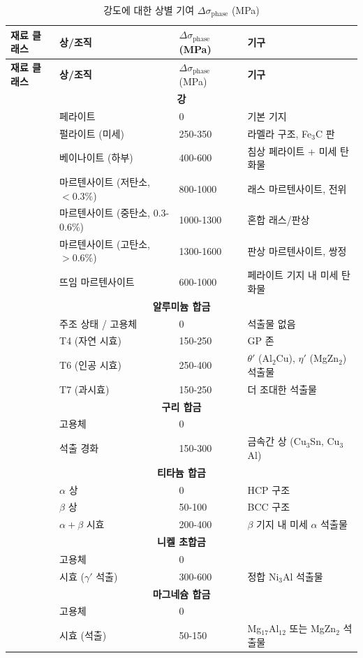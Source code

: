 \documentclass[12pt,a4paper]{article}
\begin{document}
	\begin{longtable}{p{3.5cm} p{3.0cm} p{3.0cm} p{4cm}}
		\caption{강도에 대한 상별 기여 $\Delta\sigma_{\text{phase}}$ (MPa)}\label{tab:phase_contrib}\\
		\toprule
		\textbf{재료 클래스} & \textbf{상/조직} & $\Delta\sigma_{\text{phase}}$ (MPa) & \textbf{기구} \\
		\midrule
		\endfirsthead
		\toprule
		\textbf{재료 클래스} & \textbf{상/조직} & $\Delta\sigma_{\text{phase}}$ (MPa) & \textbf{기구} \\
		\midrule
		\endhead
		\multicolumn{4}{c}{\textbf{강}} \\
		& 페라이트 & 0 & 기본 기지 \\
		& 펄라이트 (미세) & 250-350 & 라멜라 구조, Fe$_3$C 판 \\
		& 베이나이트 (하부) & 400-600 & 침상 페라이트 + 미세 탄화물 \\
		& 마르텐사이트 (저탄소, $<0.3\%$) & 800-1000 & 래스 마르텐사이트, 전위 \\
		& 마르텐사이트 (중탄소, 0.3-0.6\%) & 1000-1300 & 혼합 래스/판상 \\
		& 마르텐사이트 (고탄소, $>0.6\%$) & 1300-1600 & 판상 마르텐사이트, 쌍정 \\
		& 뜨임 마르텐사이트 & 600-1000 & 페라이트 기지 내 미세 탄화물 \\
		\hline
		\multicolumn{4}{c}{\textbf{알루미늄 합금}} \\
		& 주조 상태 / 고용체 & 0 & 석출물 없음 \\
		& T4 (자연 시효) & 150-250 & GP 존 \\
		& T6 (인공 시효) & 250-400 & $\theta'$ (Al$_2$Cu), $\eta'$ (MgZn$_2$) 석출물 \\
		& T7 (과시효) & 150-250 & 더 조대한 석출물 \\
		\hline
		\multicolumn{4}{c}{\textbf{구리 합금}} \\
		& 고용체 & 0 & \\
		& 석출 경화 & 150-300 & 금속간 상 (Cu$_3$Sn, Cu$_3$Al) \\
		\hline
		\multicolumn{4}{c}{\textbf{티타늄 합금}} \\
		& $\alpha$ 상 & 0 & HCP 구조 \\
		& $\beta$ 상 & 50-100 & BCC 구조 \\
		& $\alpha+\beta$ 시효 & 200-400 & $\beta$ 기지 내 미세 $\alpha$ 석출물 \\
		\hline
		\multicolumn{4}{c}{\textbf{니켈 초합금}} \\
		& 고용체 & 0 & \\
		& 시효 ($\gamma'$ 석출) & 300-600 & 정합 Ni$_3$Al 석출물 \\
		\hline
		\multicolumn{4}{c}{\textbf{마그네슘 합금}} \\
		& 고용체 & 0 & \\
		& 시효 (석출) & 50-150 & Mg$_{17}$Al$_{12}$ 또는 MgZn$_2$ 석출물 \\
		\bottomrule
	\end{longtable}
	
\end{document}
